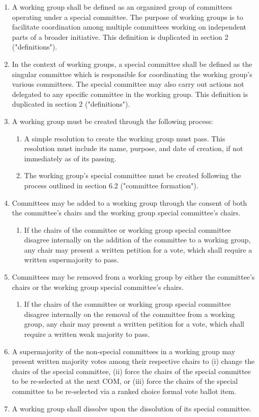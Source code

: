 \documentclass[11pt]{article}
\newcounter{h1}
\newcounter{h2}[h1]
\newcounter{h3}[h2]
\begin{document}
\begin{enumerate}
  \item A working group shall be defined as an organized group of committees operating under a special committee. The purpose of working groups is to facilitate coordination among multiple committees working on independent parts of a broader initiative. This definition is duplicated in section 2 ("definitions").
  \item In the context of working groups, a special committee shall be defined as the singular committee which is responsible for coordinating the working group's various committees. The special committee may also carry out actions not delegated to any specific committee in the working group. This definition is duplicated in section 2 ("definitions").
  \item A working group must be created through the following process:
  \begin{enumerate}
    \item A simple resolution to create the working group must pass. This resolution must include its name, purpose, and date of creation, if not immediately as of its passing.
    \item The working group's special committee must be created following the process outlined in section 6.2 ("committee formation").
  \end{enumerate}
  \item Committees may be added to a working group through the consent of both the committee's chairs and the working group special committee's chairs.
  \begin{enumerate}
    \item If the chairs of the committee or working group special committee disagree internally on the addition of the committee to a working group, any chair may present a written petition for a vote, which shall require a written supermajority to pass.
  \end{enumerate}
  \item Committees may be removed from a working group by either the committee's chairs or the working group special committee's chairs.
  \begin{enumerate}
    \item If the chairs of the committee or working group special committee disagree internally on the removal of the committee from a working group, any chair may present a written petition for a vote, which shall require a written weak majority to pass.
  \end{enumerate}
  \item A supermajority of the non-special committees in a working group may present written majority votes among their respective chairs to (i) change the chairs of the special committee, (ii) force the chairs of the special committee to be re-selected at the next COM, or (iii) force the chairs of the special committee to be re-selected via a ranked choice formal vote ballot item.
  \item A working group shall dissolve upon the dissolution of its special committee.
\end{enumerate}
\end{document}
